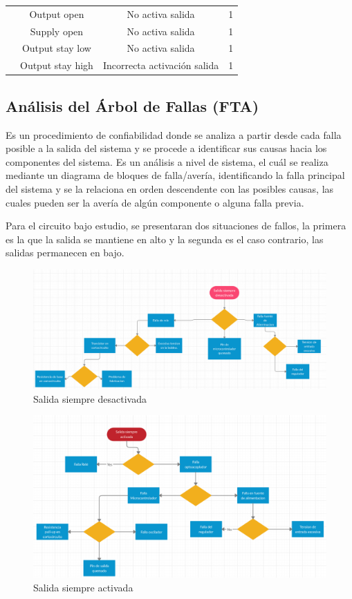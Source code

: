 \documentclass{article}
\begin{document}
\begin{table}[h!]
\begin{tabular}{@{}|c|c|c|c|@{}}
 & Output open & No activa salida & 1 \\ \cmidrule(l){2-4} 
 & Supply open & No activa salida & 1 \\ \cmidrule(l){2-4} 
 & Output stay low & No activa salida & 1 \\ \cmidrule(l){2-4} 
 & Output stay high & Incorrecta activación salida & 1 \\ \bottomrule
\end{tabular}
\end{table}


\subsection{Análisis del Árbol de Fallas (FTA)}

Es un procedimiento de confiabilidad donde se analiza a partir desde cada falla posible a la salida del sistema y se procede a identificar sus causas hacia los componentes del sistema. Es un análisis a nivel de sistema, el cuál
se realiza mediante un diagrama de bloques de falla/avería, identificando la falla principal del sistema y se la relaciona en orden descendente con las posibles causas, las cuales pueden ser la avería de algún componente o alguna falla previa.

Para el circuito bajo estudio, se presentaran dos situaciones de fallos, la primera es la que la salida se mantiene en alto y la segunda es el caso contrario, las salidas permanecen en bajo.

\begin{figure}[h!]
	\centering
	\includegraphics[width=\textwidth]{imagenes/Arbol2.png}
	\caption{Salida siempre desactivada}
\end{figure} 

\begin{figure}[h]
	\centering
	\includegraphics[width=\textwidth]{imagenes/Arbol1.png}
	\caption{Salida siempre activada}
\end{figure} 
\end{document}
